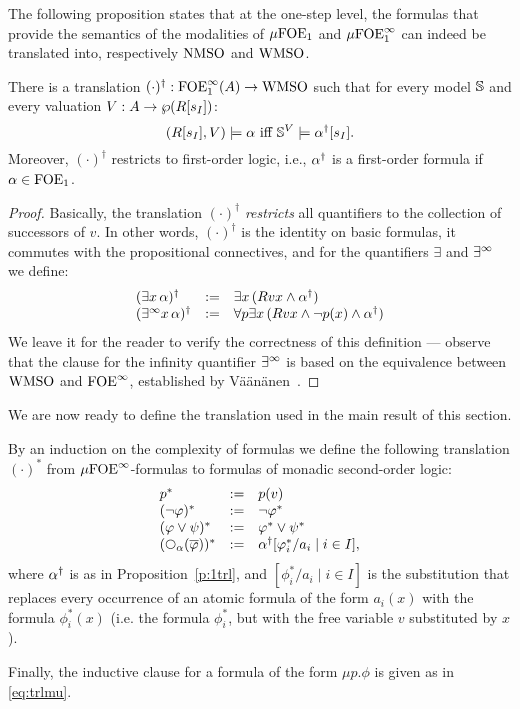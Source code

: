 The following proposition states that at the one-step level, the formulas that 
provide the semantics of the modalities of $\mu\mathrm{FOE}_1$ and $\mu\mathrm{FOE}^{\infty}_1$ can indeed 
be translated into, respectively $\mathrm{NMSO}$ and $\mathrm{WMSO}$.

\begin{proposition}
\label{p:1trl}
There is a translation $(\cdot)^{\dag}: \mathrm{FOE}^{\infty}_1(A) \to \mathrm{WMSO}$ such that for every 
model $\mathbb{S}$ and every valuation $V: A \to \wp(R[s_{I}])$:
\[
(R[s_{I}],V) \models \al \text{ iff } \bbS^{V} \models \al^{\dag}[s_{I}].
\]
Moreover, $(\cdot)^{\dag}$ restricts to first-order logic, i.e., $\alpha^{\dag}$ is
a first-order formula if $\alpha \in \mathrm{FOE}_1$.
\end{proposition}


\begin{proof}
Basically, the translation $(\cdot)^{\dag}$ \emph{restricts} all quantifiers
to the collection of successors of $v$.
In other words, $(\cdot)^{\dag}$ is the identity on basic formulas, it commutes
with the propositional connectives, and for the quantifiers $\exists$ and $\exists^\infty$
we define:
\[\begin{array}{lll}
(\exists x\, \alpha)^{\dag} &\mathrel{: =}& \exists x\, (Rvx \land \alpha^{\dag})
\\ (\exists^\infty x\, \alpha)^{\dag}  &\mathrel{: =}& \forall p \exists x\, (Rvx \land \neg p(x) 
    \land \alpha^{\dag})
\end{array}\]
We leave it for the reader to verify the correctness of this definition ---
observe that the clause for the infinity quantifier $\exists^\infty$ is based on the 
equivalence between $\mathrm{WMSO}$ and $\mathrm{FOE}^{\infty}$, established by 
V\"a\"an\"anen~\cite{vaananen77}.
\end{proof}

\noindent
We are now ready to define the translation used in the main result of this 
section.

\begin{definition}
By an induction on the complexity of formulas we define the following 
translation $(\cdot)^{*}$ from $\mu\mathrm{FOE}^{\infty}$-formulas to formulas of monadic 
second-order logic:
\[\begin{array}{lll}
   p^{*} &\df& p(v)
\\ (\neg\phi)^{*}        &\df& \neg \phi^{*}
\\ (\phi\lor\psi)^{*}    &\df& \phi^{*} \lor \psi^{*}
\\ (\nxt{\al}(\ol{\phi}))^{*} &\df& \al^{\dag}[\phi_{i}^{*}/a_{i} \mid i \in I],
\end{array}\]
where $\alpha^{\dag}$ is as in Proposition~\ref{p:1trl}, and $[\phi_{i}^{*}/a_{i}
\mid i \in I]$ is the substitution that replaces every occurrence of an atomic
formula of the form $a_{i}(x)$ with the formula $\phi_{i}^{*}(x)$ (i.e. the 
formula $\phi_{i}^{*}$, but with the free variable $v$ substituted by $x$).

Finally, the inductive clause for a formula of the form $\mu p.\phi$ is given
as in \eqref{eq:trlmu}.
\end{definition}


